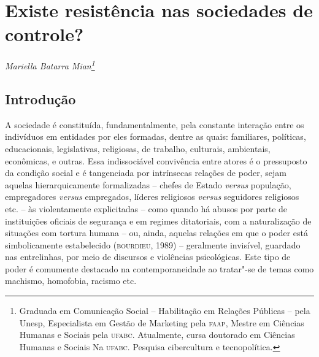 \chapter*{Existe resistência nas sociedades de controle? }


\begin{flushright}
\emph{Mariella Batarra Mian\footnote{Graduada em Comunicação Social -- Habilitação em Relações Públicas -- pela Unesp, Especialista em Gestão de Marketing pela \textsc{faap}, Mestre em Ciências Humanas e Sociais pela \textsc{ufabc}. Atualmente, cursa doutorado em Ciências Humanas e Sociais Na \textsc{ufabc}. Pesquisa cibercultura e tecnopolítica.}}
\end{flushright}


 \section{Introdução}

\noindent{}A sociedade é constituída, fundamentalmente, pela constante interação
entre os indivíduos em entidades por eles formadas, dentre as quais:
familiares, políticas, educacionais, legislativas, religiosas, de
trabalho, culturais, ambientais, econômicas, e outras. Essa
indissociável convivência entre atores é o pressuposto da condição
social e é tangenciada por intrínsecas relações de poder, sejam aquelas
hierarquicamente formalizadas -- chefes de Estado \emph{versus}
população, empregadores \emph{versus} empregados, líderes religiosos
\emph{versus} seguidores religiosos etc. -- às violentamente
explicitadas -- como quando há abusos por parte de instituições oficiais
de segurança e em regimes ditatoriais, com a naturalização de situações
com tortura humana -- ou, ainda, aquelas relações em que o poder está
simbolicamente estabelecido (\textsc{bourdieu}, 1989) -- geralmente invisível,
guardado nas entrelinhas, por meio de discursos e violências
psicológicas. Este tipo de poder é comumente destacado na
contemporaneidade ao tratar"-se de temas como machismo, homofobia,
racismo etc.

